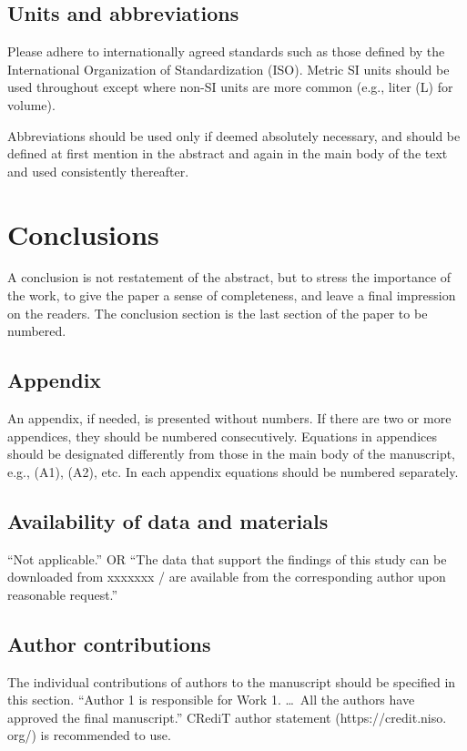 \documentclass{CVM}
\begin{document}
\subsection{Units and abbreviations}
Please adhere to internationally agreed standards such as those defined by
the International Organization of Standardization (ISO). Metric SI units
should be used throughout except where non-SI units are more common (e.g.,
liter (L) for volume).

Abbreviations should be used only if deemed absolutely necessary, and should
be defined at first mention in the abstract and again in the main body of
the text and used consistently thereafter.

\section{Conclusions}
A conclusion is not restatement of the abstract, but to stress the
importance of the work, to give the paper a sense of completeness, and leave
a final impression on the readers. The conclusion section is the last
section of the paper to be numbered.

\appendix

\subsection*{Appendix }
An appendix, if needed, is presented without numbers. If there are two or
more appendices, they should be numbered consecutively. Equations in
appendices should be designated differently from those in the main body of
the manuscript, e.g., (A1), (A2), etc. In each appendix equations should be
numbered separately.

\subsection*{Availability of data and materials}

``Not applicable.'' OR ``The data that support the findings of this study can be downloaded from xxxxxxx / are available from the corresponding author upon reasonable request.''

\subsection*{Author contributions}

The individual contributions of authors to the manuscript should be specified in this section. ``Author 1 is responsible for Work 1. \dots\ All the authors have approved the final manuscript.'' CRediT author statement (https://credit.niso. org/) is recommended to use.
\end{document}
